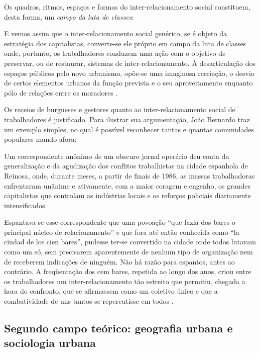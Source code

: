 Os quadros, ritmos, espaços e formas do inter-relacionamento social constituem, desta forma, um \textit{campo da luta de classes}:

\begin{citacao}
E vemos assim que o inter-relacionamento social genérico, se é objeto da estratégia dos capitalistas, converte-se ele próprio em campo da luta de classes onde, portanto, os trabalhadores conduzem uma ação com o objetivo de preservar, ou de restaurar, sistemas de inter-relacionamento. À desarticulação dos espaços públicos pelo novo urbanismo, opõe-se uma imaginosa recriação, o desvio de certos elementos urbanos da função prevista e o seu aproveitamento enquanto pólo de relações entre os moradores \cite[p.~331]{BERNARDO1991}. 
\end{citacao}

Os receios de burgueses e gestores quanto ao inter-relacionamento social de trabalhadores é justificado. Para ilustrar sua argumentação, João Bernardo traz um exemplo simples, no qual é possível reconhecer tantas e quantas comunidades populares mundo afora:

\begin{citacao}
Um correspondente anônimo de um obscuro jornal operário deu conta da generalização e da agudização dos conflitos trabalhistas na cidade espanhola de Reinosa, onde, durante meses, a partir de finais de 1986, as massas trabalhadoras enfrentaram unânime e ativamente, com a maior coragem e engenho, os grandes capitalistas que controlam as indústrias locais e os reforços policiais diariamente intensificados.

Espantava-se esse correspondente que uma povoação ``que fazia dos bares o principal núcleo de relacionamento'' e que fora até então conhecida como ``la ciudad de los cien bares'', pudesse ter-se convertido na cidade onde todos lutavam como um só, sem precisarem aparentemente de nenhum tipo de organização nem de receberem indicações de ninguém. Não há razão para espantos, antes ao contrário. A freqüentação dos cem bares, repetida ao longo dos anos, criou entre os trabalhadores um inter-relacionamento tão estreito que permitiu, chegada a hora do confronto, que se afirmassem como um coletivo único e que a combatividade de uns tantos se repercutisse em todos \cite[p.~329-330]{BERNARDO1991}.
\end{citacao}

\subsection{Segundo campo teórico: geografia urbana e sociologia urbana}
\label{subsec:sociogeogrurb}

